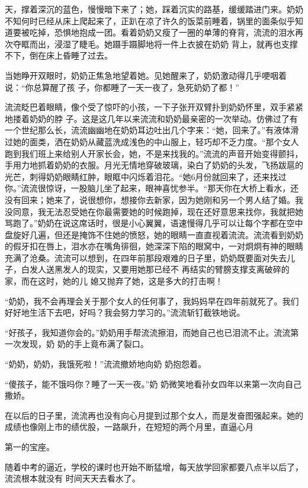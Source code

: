 \documentclass{article}
\begin{document}
天，撑着深沉的蓝色，慢慢暗下来了；她，踩着沉实的路基，缓缓踏进门来。奶奶不知何时已经从床上爬起来了，正趴在凉了许久的饭菜前睡着，锅里的面条似乎知道要被吃掉，恐惧地抱成一团。看着奶奶又瘦了一圈的单薄的脊背，流流的泪水再次夺眶而出，浸湿了睫毛。她蹑手蹑脚地将一件上衣披在奶奶
背上，就再也支撑不下，倒在床上昏睡了过去。 

当她睁开双眼时，奶奶正焦急地望着她。见她醒来了，奶奶激动得几乎哽咽着说：“你总算醒了孩
子，你都睡了一天一夜了，急死奶奶了都！” 

流流眨巴着眼睛，像个受了惊吓的小孩，一下子张开双臂扑到奶奶怀里，双手紧紧地搂着奶奶的脖
\newpage
子。这是这几年以来流流和奶奶最亲密的一次举动。仿佛过了有一个世纪那么长，流流幽幽地在奶奶耳边吐出几个字来：“她，回来了。”有液体滑过她的面类，洒在奶奶从藏蓝洗成浅色的中山服上，轻巧却不乏力度。“那个女人跑到我们班上来给别人开家长会，她，不是来找我的。”流流的声音开始变得颤抖，手用力地抓着奶奶的衣服。月光无情地穿破玻璃，染白了奶奶的头发，飞扬跋扈的光芒，刺得奶奶眼睛红肿，眼眶中闪烁着泪花。“她6月份就回来了，还来找过你。”流流很惊讶，一股脑儿坐了起来，眼神喜忧参半。“那天你在大桥上看水，还没有回来；她来了，说很想你，想接你去新家，因为她刚和另一个男人结了婚。我没同意，我无法忍受她在你最需要她的时候跑掉，现在还好意思来找你，我就把她骂跑了。”奶奶在说这席话时，很是小心翼翼，语速慢得几乎可以让每个字都在空中盘旋好几遍，但还是掩饰不住她的愤怒，她的眼睛一直直视着流流。流流看到奶奶的假牙扣在唇上，泪水亦在嘴角徘徊，她深深下陷的眼窝中，一对炯炯有神的眼睛充满了沧桑。流流可以想到，在四年前那段艰难的日子里，奶奶既要面对失去儿子，白发人送黑发人的现实，又要用她那已经不
\newpage
再结实的臂膀支撑支离破碎的家，而在这时，她的儿
媳又抛弃了她，这是多大的打击啊！ 

“奶奶，我不会再理会关于那个女人的任何事了，我妈妈早在四年前就死了。我们好好地生活下去吧，好吗？我会努力学习的。”流流斩钉截铁地说。

“好孩子，我知道你会的。”奶奶用手帮流流擦泪，而她自己也已泪流不止。流流第一次发现，奶
奶的手上竟布满了裂口。 

“奶奶，奶奶，我饿死啦！”流流撤娇地向奶
奶抱怨着。 

“傻孩子，能不饿吗你？睡了一天一夜。”奶
奶微笑地看孙女四年以来第一次向自己撒娇。 

在以后的日子里，流流再也没有向心月提到过那个女人，而是发奋图强起来。她的成绩也像刚上市的绩优股，一路飙升，在短短的两个月里，直逼心月

\newpage
第一的宝座。 

随着中考的逼近，学校的课时也开始不断猛增，每天放学回家都要八点半以后了，流流根本就没有
时间天天去看水了。 
\end{document}
